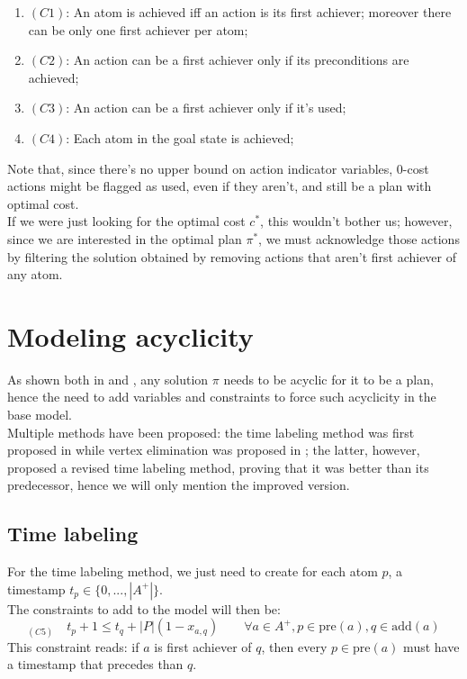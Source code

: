 \begin{enumerate}
    \item[]$(C1)$: An atom is achieved iff an action is its first achiever; moreover there can be only one first achiever per atom;
    \item[]$(C2)$: An action can be a first achiever only if its preconditions are achieved;
    \item[]$(C3)$: An action can be a first achiever only if it's used;
    \item[]$(C4)$: Each atom in the goal state is achieved;
\end{enumerate}
Note that, since there's no upper bound on action indicator variables, 0-cost actions might be flagged as used, even if they aren't, and still be a plan with optimal cost.\\
If we were just looking for the optimal cost $c^*$, this wouldn't bother us; however, since we are interested in the optimal plan $\pi^*$, we must acknowledge those actions by filtering the solution obtained by removing actions that aren't first achiever of any atom.

\section{Modeling acyclicity}
As shown both in \cite{Imai_15} and \cite{Rankooh_22}, any solution $\pi$ needs to be acyclic for it to be a plan, hence the need to add variables and constraints to force such acyclicity in the base model.\\
Multiple methods have been proposed: the time labeling method was first proposed in \cite{Imai_15} while vertex elimination was proposed in \cite{Rankooh_22}; the latter, however, proposed a revised time labeling method, proving that it was better than its predecessor, hence we will only mention the improved version.

\subsection{Time labeling}
For the time labeling method, we just need to create for each atom $p$, a timestamp $t_p\in\{0,...,|A^+|\}$.\\
The constraints to add to the model will then be:
$$_{(C5)}\quad t_p + 1 \leq t_q + |P|(1-x_{a, q})\qquad\forall a\in A^+,p\in \mbox{pre}(a),q\in \mbox{add}(a)$$
This constraint reads: if $a$ is first achiever of $q$, then every $p\in \mbox{pre}(a)$ must have a timestamp that precedes than $q$.

